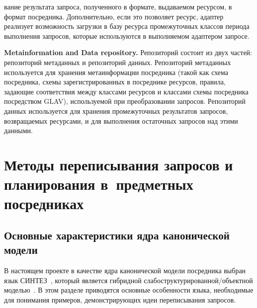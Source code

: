 \begin{multicols}{2}
\noindent
вание результата запроса, полученного в
формате, выдаваемом ресурсом, в формат посредника. Дополнительно, если это позволяет
ресурс, адаптер реализует возможность загрузки в базу ресурса промежуточных классов
периода выполнения запросов, которые используются в выполняемом адаптером запросе.

\medskip

\noindent
\textbf{Metainformation and Data repository.} Репозиторий состоит из двух частей:
репозиторий метаданных и репозиторий данных. Репозиторий метаданных используется
для хранения метаинформации посредника (такой как схема посредника, схемы
зарегистрированных в посреднике ресурсов, правила, задающие соответствия между
классами ресурсов и классами схемы посредника посредством GLAV),
используемой при преобразовании запросов. Репозиторий данных используется для
хранения промежуточных результатов запросов, возвращаемых ресурсами, и для
выполнения остаточных запросов над этими данными.

\section{Методы переписывания запросов и планирования в~предметных
посредниках}

\subsection{Основные характеристики ядра канонической модели}

     В настоящем проекте в качестве ядра канонической модели посредника выбран язык
СИНТЕЗ~\cite{KlaStu07}, который является гибридной
слабоструктурированной/объектной моделью~\cite{Kla991}. В этом
разде\-ле приводятся
основные особенности языка, необходимые для понимания примеров, де\-мон\-ст\-ри\-ру\-ющих
идеи переписывания запросов.


\end{multicols}
